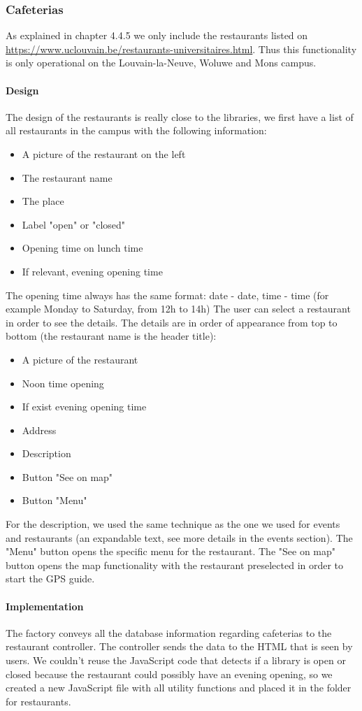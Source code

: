 \documentclass{eplmastersthesis}
\begin{document}
\subsubsection{Cafeterias}
As explained in chapter 4.4.5 we only include the restaurants listed on \url{https://www.uclouvain.be/restaurants-universitaires.html}. Thus this functionality is only operational on the Louvain-la-Neuve, Woluwe and Mons campus.
\paragraph{Design}
The design of the restaurants is really close to the libraries, we first have a list of all restaurants in the campus with the following information:
\begin{itemize}
\item A picture of the restaurant on the left
\item The restaurant name
\item The place
\item Label "open" or "closed"
\item Opening time on lunch time
\item If relevant, evening opening time
\end{itemize}
The opening time always has the same format: date - date, time - time (for example Monday to Saturday, from 12h to 14h)
The user can select a restaurant in order to see the details. The details are in order of appearance from top to bottom (the restaurant name is the header title): 
\begin{itemize}
\item A picture of the restaurant
\item Noon time opening 
\item If exist evening opening time 
\item Address
\item Description
\item Button "See on map"
\item Button "Menu"
\end{itemize}
For the description, we used the same technique as the one we used for events and restaurants (an expandable text, see more details in the events section). The "Menu" button opens the specific menu for the restaurant. The "See on map" button opens the map functionality with the restaurant preselected in order to start the GPS guide.
\paragraph{Implementation}
The factory conveys all the database information regarding cafeterias to the restaurant controller. The controller sends the data to the HTML that is seen by users. We couldn't reuse the JavaScript code that detects if a library is open or closed because the restaurant could possibly have an evening opening, so we created a new JavaScript file with all utility functions and placed it in the folder for restaurants. 
\end{document}
